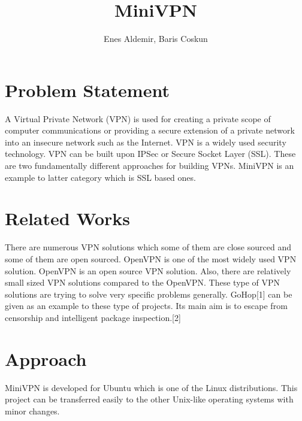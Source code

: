 \documentclass[letterpaper, 10 pt, conference]{ieeeconf}  %
\title{\LARGE \bf
MiniVPN
}
\author{Enes Aldemir, Baris Coskun}%
\begin{document}
\maketitle
\thispagestyle{empty}
\pagestyle{empty}



\section{Problem Statement}

A Virtual Private Network (VPN) is used for creating a private scope of computer communications or providing a secure extension of a private network into an insecure network such as the Internet. VPN is a widely used security technology. VPN can be built upon IPSec or Secure Socket Layer (SSL). These are two fundamentally different approaches for building VPNs. MiniVPN is an example to latter category which is SSL based ones. 	

\section{Related Works}

There are numerous VPN solutions which some of them are close sourced and some of them are open sourced. OpenVPN is one of the most widely used VPN solution. OpenVPN is an open source VPN solution. Also, there are relatively small sized VPN solutions compared to the OpenVPN. These type of VPN solutions are trying to solve very specific problems generally. GoHop[1] can be given as an example to these type of projects. Its main aim is to escape from censorship and intelligent package inspection.[2] 

\section{Approach}

MiniVPN is developed for Ubuntu which is one of the Linux distributions. This project can be transferred easily to the other Unix-like operating systems with minor changes. 
\end{document}
